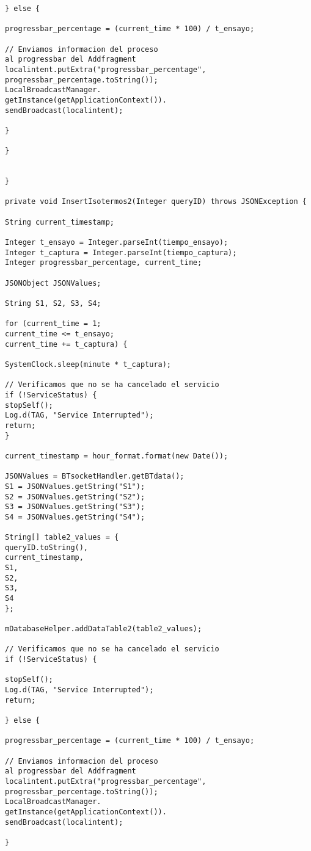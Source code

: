 \begin{lstlisting}
} else {

progressbar_percentage = (current_time * 100) / t_ensayo;

// Enviamos informacion del proceso 
al progressbar del Addfragment
localintent.putExtra("progressbar_percentage",
progressbar_percentage.toString());
LocalBroadcastManager.
getInstance(getApplicationContext()).
sendBroadcast(localintent);

}

}


}

private void InsertIsotermos2(Integer queryID) throws JSONException {

String current_timestamp;

Integer t_ensayo = Integer.parseInt(tiempo_ensayo);
Integer t_captura = Integer.parseInt(tiempo_captura);
Integer progressbar_percentage, current_time;

JSONObject JSONValues;

String S1, S2, S3, S4;

for (current_time = 1; 
current_time <= t_ensayo; 
current_time += t_captura) {

SystemClock.sleep(minute * t_captura);

// Verificamos que no se ha cancelado el servicio
if (!ServiceStatus) {
stopSelf();
Log.d(TAG, "Service Interrupted");
return;
}

current_timestamp = hour_format.format(new Date());

JSONValues = BTsocketHandler.getBTdata();
S1 = JSONValues.getString("S1");
S2 = JSONValues.getString("S2");
S3 = JSONValues.getString("S3");
S4 = JSONValues.getString("S4");

String[] table2_values = {
queryID.toString(),
current_timestamp,
S1,
S2,
S3,
S4
};

mDatabaseHelper.addDataTable2(table2_values);

// Verificamos que no se ha cancelado el servicio
if (!ServiceStatus) {

stopSelf();
Log.d(TAG, "Service Interrupted");
return;

} else {

progressbar_percentage = (current_time * 100) / t_ensayo;

// Enviamos informacion del proceso 
al progressbar del Addfragment
localintent.putExtra("progressbar_percentage",
progressbar_percentage.toString());
LocalBroadcastManager.
getInstance(getApplicationContext()).
sendBroadcast(localintent);

}


\end{lstlisting}
